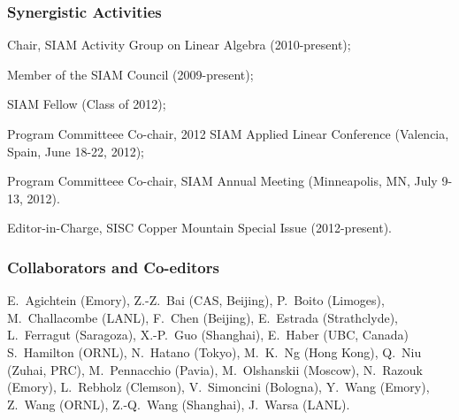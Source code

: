 
\subsubsection*{Synergistic Activities} 
\begin{enumerate*}
\item Chair, SIAM Activity Group on Linear Algebra (2010-present); 
\item Member
of the SIAM Council (2009-present); 
\item SIAM Fellow (Class of 2012); 
\item Program Committeee Co-chair,
2012 SIAM Applied Linear Conference (Valencia, Spain, June 18-22, 2012); 
\item Program Committeee Co-chair, SIAM Annual Meeting (Minneapolis, MN,
July 9-13, 2012).
\item Editor-in-Charge, SISC Copper Mountain Special Issue (2012-present).
\end{enumerate*}

\subsubsection*{Collaborators and Co-editors}
\vspace*{-1ex}

{\parindent 0.2in \narrower 
E.~Agichtein (Emory), Z.-Z.~Bai (CAS, Beijing), 
P.~Boito (Limoges), M.~Challacombe (LANL), F.~Chen (Beijing),
E.~Estrada (Strathclyde), L.~Ferragut (Saragoza), 
X.-P.~Guo (Shanghai), E.~Haber (UBC, Canada)
S.~Hamilton (ORNL), N.~Hatano (Tokyo), M.~K.~Ng (Hong Kong), 
Q.~Niu (Zuhai, PRC), M.~Pennacchio (Pavia), M.~Olshanskii (Moscow), 
N.~Razouk (Emory), L.~Rebholz (Clemson), V.~Simoncini 
(Bologna), Y.~Wang (Emory), Z.~Wang (ORNL), Z.-Q.~Wang (Shanghai),
J.~Warsa (LANL).
}


